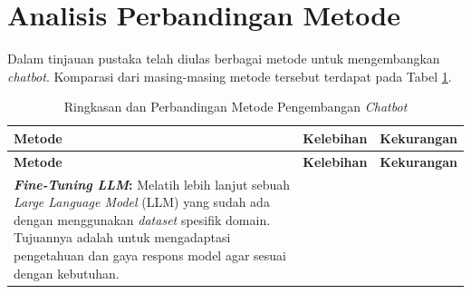 \section{Analisis Perbandingan Metode}

Dalam tinjauan pustaka telah diulas berbagai metode untuk mengembangkan \textit{chatbot}.
Komparasi dari masing-masing metode tersebut terdapat pada Tabel \ref{tab:method-comparision}.

\begin{longtable}{|p{4cm}|p{5cm}|p{5cm}|}
	\caption{Ringkasan dan Perbandingan Metode Pengembangan \textit{Chatbot}} \label{tab:method-comparision}                                                                                                                  \\
	\hline
	\textbf{Metode}                                                                                                                                                                & \textbf{Kelebihan} & \textbf{Kekurangan} \\
	\hline
	\endfirsthead

	\hline
	\textbf{Metode}                                                                                                                                                                & \textbf{Kelebihan} & \textbf{Kekurangan} \\
	\hline
	\endhead

	\hline
	\endfoot

	\textbf{\textit{Fine-Tuning LLM}: }
	Melatih lebih lanjut sebuah \textit{Large Language Model} (LLM) yang sudah ada dengan menggunakan \textit{dataset} spesifik domain.
	Tujuannya adalah untuk mengadaptasi pengetahuan dan gaya respons model agar sesuai dengan kebutuhan.                                                                           &


\end{longtable}
